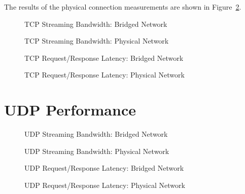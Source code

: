 The results of the physical connection measurements are shown in Figure~\ref{fig:tcp_stream_phys}.


\begin{figure}
    \centering
    \def\svgwidth{\columnwidth}
    
    \caption{TCP Streaming Bandwidth: Bridged Network}
    \label{fig:tcp_stream_bridge}
\end{figure}
\begin{figure}
    \centering
    \def\svgwidth{\columnwidth}
    
    \caption{TCP Streaming Bandwidth: Physical Network}
    \label{fig:tcp_stream_phys}
\end{figure}

\begin{figure}
    \centering
    
    \caption{TCP Request/Response Latency: Bridged Network}
    \label{fig:tcp_rr_bridge}
\end{figure}
\begin{figure}
    \centering
    \def\svgwidth{\columnwidth}
    
    \caption{TCP Request/Response Latency: Physical Network}
    \label{fig:tcp_rr_phys}
\end{figure}


\section{UDP Performance} %
\begin{figure}
    \centering
    \def\svgwidth{\columnwidth}
    
    \caption{UDP Streaming Bandwidth: Bridged Network}
    \label{fig:udp_stream_bridge}
\end{figure}
\begin{figure}
    \centering
    \def\svgwidth{\columnwidth}
    
    \caption{UDP Streaming Bandwidth: Physical Network}
    \label{fig:udp_stream_phys}
\end{figure}

\label{sec:udp_performance}
\begin{figure}
    \centering
    \def\svgwidth{\columnwidth}
    
    \caption{UDP Request/Response Latency: Bridged Network}
    \label{fig:udp_rr_bridge}
\end{figure}
\begin{figure}
    \centering
    \def\svgwidth{\columnwidth}
    
    \caption{UDP Request/Response Latency: Physical Network}
    \label{fig:udp_rr_phys}
\end{figure}
